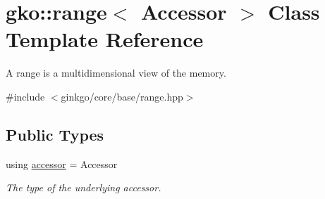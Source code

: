 \hypertarget{classgko_1_1range}{}\section{gko\+:\+:range$<$ Accessor $>$ Class Template Reference}
\label{classgko_1_1range}


A range is a multidimensional view of the memory.  




{\ttfamily \#include $<$ginkgo/core/base/range.\+hpp$>$}

\subsection*{Public Types}
\begin{DoxyCompactItemize}
\item 
\mbox{\label{classgko_1_1range_a3332728e51dadcf6517847cef3000a17}} 
using \hyperlink{classgko_1_1range_a3332728e51dadcf6517847cef3000a17}{accessor} = Accessor
\begin{DoxyCompactList}\small\item\em The type of the underlying accessor. \end{DoxyCompactList}\end{DoxyCompactItemize}

